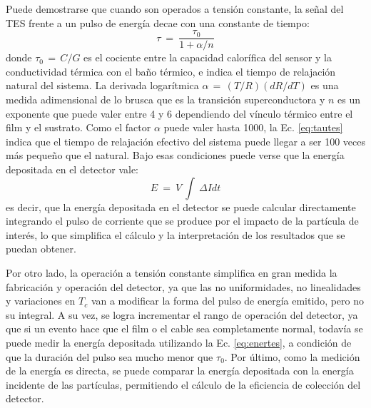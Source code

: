 Puede demostrarse\citep{Irwin1995} que cuando son operados a tensión constante, la señal del TES frente a un pulso de energía decae con una constante de tiempo:
\begin{equation}
\tau \ = \ \frac{\tau_0}{1+\alpha/n}
\label{eq:tautes}
\end{equation}
\noindent
donde $\tau_0 \, = \, C/G$ es el cociente entre la capacidad calorífica del sensor y la conductividad térmica con el baño térmico, e indica el tiempo de relajación natural del sistema. La derivada logarítmica $\alpha \, = \, (T/R) (dR/dT)$ es una medida adimensional de lo brusca que es la transición superconductora y $n$ es un exponente que puede valer entre 4 y 6 dependiendo del vínculo térmico entre el film y el sustrato. Como el factor $\alpha$ puede valer hasta 1000, la Ec. \ref{eq:tautes} indica que el tiempo de relajación efectivo del sistema puede llegar a ser 100 veces más pequeño que el natural. Bajo esas condiciones puede verse que la energía depositada en el detector vale\citep{Irwin1995}:
\begin{equation}
E \ = \ V \ \int \ \Delta I dt
\label{eq:enertes}
\end{equation}
\noindent
es decir, que la energía depositada en el detector se puede calcular directamente integrando el pulso de corriente que se produce por el impacto de la partícula de interés, lo que simplifica el cálculo y la interpretación de los resultados que se puedan obtener.

Por otro lado, la operación a tensión constante simplifica en gran medida la fabricación y operación del detector, ya que las no uniformidades, no linealidades y variaciones en $T_c$ van a modificar la forma del pulso de energía emitido, pero no su integral. A su vez, se logra incrementar el rango de operación del detector, ya que si un evento hace que el film o el cable sea completamente normal, todavía se puede medir la energía depositada utilizando la Ec. \ref{eq:enertes}, a condición de que la duración del pulso sea mucho menor que $\tau_0$. Por último, como la medición de la energía es directa, se  puede comparar la energía depositada con la energía incidente de las partículas, permitiendo el cálculo de la eficiencia de colección del detector\cite{Irwin1995}.

